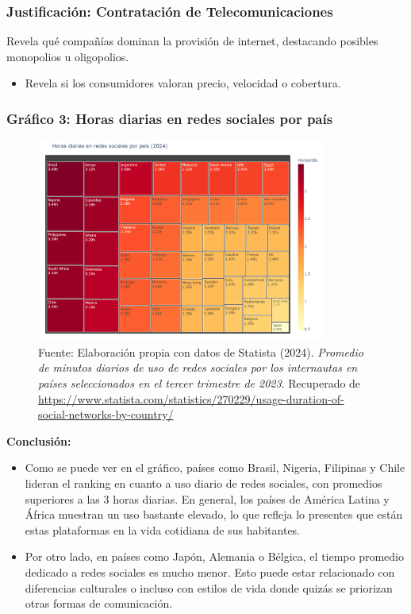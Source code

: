 \documentclass[12pt, a4paper]{article}
\begin{document}
\subsubsection*{Justificación: Contratación de Telecomunicaciones}
Revela qué compañías dominan la provisión de internet, destacando posibles monopolios u oligopolios.
\begin{itemize}
    \item Revela si los consumidores valoran precio, velocidad o cobertura.
\end{itemize}

\subsubsection*{Gráfico 3: Horas diarias en redes sociales por país}
\begin{figure}[H]
    \centering
    \includegraphics[width=0.85\textwidth]{images/graph1_JG.png}
    \caption{
        Fuente: Elaboración propia con datos de Statista (2024). 
        \textit{Promedio de minutos diarios de uso de redes sociales por los internautas en países seleccionados en el tercer trimestre de 2023}. 
        Recuperado de \url{https://www.statista.com/statistics/270229/usage-duration-of-social-networks-by-country/}
    }
\end{figure}

\newpage
\textbf{Conclusión:}  
\begin{itemize}
    \item Como se puede ver en el gráfico, países como Brasil, Nigeria, Filipinas y Chile lideran el ranking en cuanto a uso diario de redes sociales, con promedios superiores a las 3 horas diarias. En general, los países de América Latina y África muestran un uso bastante elevado, lo que refleja lo presentes que están estas plataformas en la vida cotidiana de sus habitantes.
    \item Por otro lado, en países como Japón, Alemania o Bélgica, el tiempo promedio dedicado a redes sociales es mucho menor. Esto puede estar relacionado con diferencias culturales o incluso con estilos de vida donde quizás se priorizan otras formas de comunicación.
\end{itemize}
\end{document}
